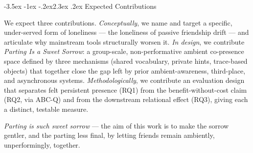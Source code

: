 \documentclass[11pt]{article}
\makeatletter
\renewcommand\section{\@startsection{section}{1}{\z@}%
  {-3.5ex \@plus -1ex \@minus -.2ex}{2.3ex \@plus .2ex}%
  {\normalfont\Large\bfseries\color{accent}}}
\makeatother
\begin{document}
\section{Expected Contributions}

We expect three contributions. \emph{Conceptually}, we name and target a
specific, under-served form of loneliness --- the loneliness of passive
friendship drift --- and articulate why mainstream tools structurally worsen it.
\emph{In design}, we contribute \textit{Parting Is a Sweet Sorrow}: a
group-scale, non-performative ambient co-presence space defined by three
mechanisms (shared vocabulary, private hints, trace-based objects) that together
close the gap left by prior ambient-awareness, third-place, and asynchronous
systems. \emph{Methodologically}, we contribute an evaluation design that
separates felt persistent presence (RQ1) from the benefit-without-cost claim
(RQ2, via ABC-Q) and from the downstream relational effect (RQ3), giving each a
distinct, testable measure.

\vspace{0.4em}
\noindent\textit{Parting is such sweet sorrow} --- the aim of this work is to
make the sorrow gentler, and the parting less final, by letting friends remain
ambiently, unperformingly, together.



\end{document}
